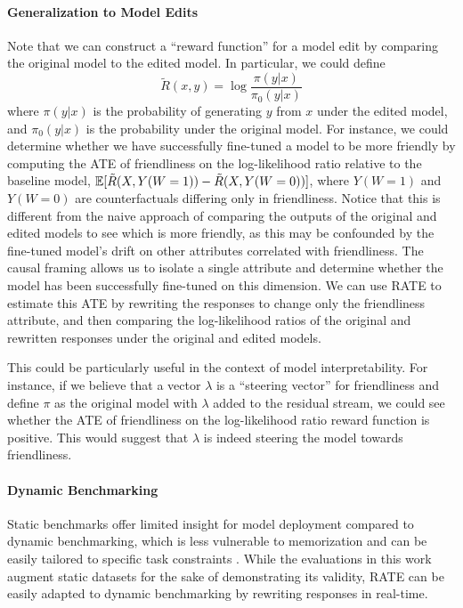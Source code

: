 \documentclass{article}
\begin{document}
\paragraph{Generalization to Model Edits}
Note that we can construct a ``reward function'' for a model edit by comparing the original model to the edited model.  In particular, we could define
\[\tilde{R}(x, y) = \log\frac{\pi(y|x)}{\pi_0(y|x)}\]
where $\pi(y|x)$ is the probability of generating $y$ from $x$ under the edited model, and $\pi_0(y|x)$ is the probability under the original model. For instance, we could determine whether we have successfully fine-tuned a model to be more friendly by computing the ATE of friendliness on the log-likelihood ratio relative to the baseline model, $\mathbb{E}[\tilde{R}(X, Y(W=1)) - \tilde{R}(X, Y(W=0))]$, where $Y(W=1)$ and $Y(W=0)$ are counterfactuals differing only in friendliness. Notice that this is different from the naive approach of comparing the outputs of the original and edited models to see which is more friendly, as this may be confounded by the fine-tuned model's drift on other attributes correlated with friendliness. The causal framing allows us to isolate a single attribute and determine whether the model has been successfully fine-tuned on this dimension. We can use RATE to estimate this ATE by rewriting the responses to change only the friendliness attribute, and then comparing the log-likelihood ratios of the original and rewritten responses under the original and edited models.

This could be particularly useful in the context of model interpretability. For instance, if we believe that a vector $\lambda$ is a ``steering vector'' for friendliness and define $\pi$ as the original model with $\lambda$ added to the residual stream, we could see whether the ATE of friendliness on the log-likelihood ratio reward function is positive. This would suggest that $\lambda$ is indeed steering the model towards friendliness.

\paragraph{Dynamic Benchmarking} Static benchmarks offer limited insight for model deployment compared to dynamic benchmarking, which is less vulnerable to memorization and can be easily tailored to specific task constraints \citep{saxon2024benchmarksmicroscopesmodelmetrology}. While the evaluations in this work augment static datasets for the sake of demonstrating its validity, RATE can be easily adapted to dynamic benchmarking by rewriting responses in real-time.
\end{document}
